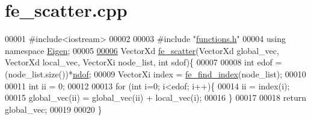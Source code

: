 \hypertarget{fe__scatter_8cpp_source}{}\section{fe\+\_\+scatter.\+cpp}
\label{fe__scatter_8cpp_source}

\begin{DoxyCode}
00001 \textcolor{preprocessor}{#include<iostream>}
00002 
00003 \textcolor{preprocessor}{#include "\hyperlink{functions_8h}{functions.h}"}
00004 \textcolor{keyword}{using namespace }\hyperlink{namespace_eigen}{Eigen};
00005 
\hyperlink{fe__scatter_8cpp_a6b8344e12f9005795f93f60ddda26c5c}{00006} VectorXd \hyperlink{fe__scatter_8cpp_a6b8344e12f9005795f93f60ddda26c5c}{fe\_scatter}(VectorXd global\_vec, VectorXd local\_vec, VectorXi node\_list, \textcolor{keywordtype}{int} sdof)\{
00007 
00008     \textcolor{keywordtype}{int} edof = (node\_list.size())*\hyperlink{_global_variables_8h_aa789fe4d8a13fd0990b630909430d5d0}{ndof};
00009     VectorXi index = \hyperlink{functions_8h_ae4dbe24b761cafa3577afab76726b382}{fe\_find\_index}(node\_list);
00010 
00011     \textcolor{keywordtype}{int} ii = 0;
00012 
00013     \textcolor{keywordflow}{for} (\textcolor{keywordtype}{int} i=0; i<edof; i++)\{
00014         ii = index(i);
00015         global\_vec(ii) = global\_vec(ii) + local\_vec(i);
00016     \}
00017 
00018     \textcolor{keywordflow}{return} global\_vec;
00019 
00020 \}
\end{DoxyCode}
